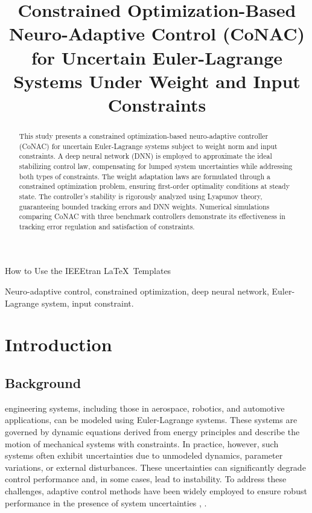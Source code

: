 \documentclass[lettersize,journal]{IEEEtran}
\begin{document}
\title{
Constrained Optimization-Based Neuro-Adaptive Control (CoNAC) for Uncertain Euler-Lagrange Systems Under Weight and Input Constraints 
}

%
{How to Use the IEEEtran \LaTeX \ Templates}

\maketitle

\begin{abstract}
    This study presents a constrained optimization-based neuro-adaptive controller (CoNAC) for uncertain Euler-Lagrange systems subject to weight norm and input constraints. A deep neural network (DNN) is employed to approximate the ideal stabilizing control law, compensating for lumped system uncertainties while addressing both types of constraints. The weight adaptation laws are formulated through a constrained optimization problem, ensuring first-order optimality conditions at steady state. The controller's stability is rigorously analyzed using Lyapunov theory, guaranteeing bounded tracking errors and DNN weights. Numerical simulations comparing CoNAC with three benchmark controllers demonstrate its effectiveness in tracking error regulation and satisfaction of constraints.
\end{abstract}

\begin{IEEEkeywords}
Neuro-adaptive control, constrained optimization, deep neural network, Euler-Lagrange system, input constraint.
\end{IEEEkeywords}

\section{Introduction}

\subsection{Background}

 engineering systems, including those in aerospace, robotics, and automotive applications, can be modeled using Euler-Lagrange systems. These systems are governed by dynamic equations derived from energy principles and describe the motion of mechanical systems with constraints. In practice, however, such systems often exhibit uncertainties due to unmodeled dynamics, parameter variations, or external disturbances. These uncertainties can significantly degrade control performance and, in some cases, lead to instability. To address these challenges, adaptive control methods have been widely employed to ensure robust performance in the presence of system uncertainties \cite{RN4}, \cite{RN2}.
\end{document}
